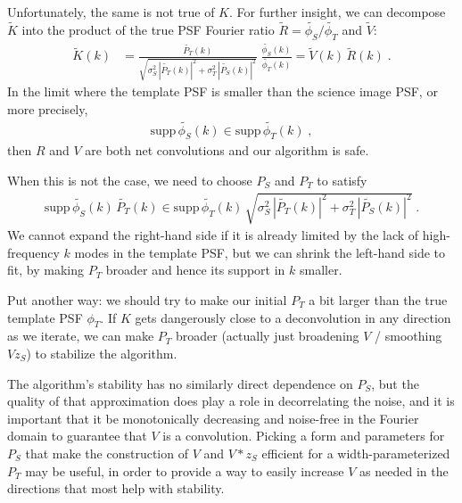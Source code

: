 \documentclass[DM,authoryear,toc]{lsstdoc}
\begin{document}
Unfortunately, the same is not true of $K$.
For further insight, we can decompose $\widetilde{K}$ into the product of the true PSF Fourier ratio $\widetilde{R} = \widetilde{\phi_S}/\widetilde{\phi_T}$ and $\widetilde{V}$:
\begin{align}
  \widetilde{K}(k) & = \frac{
    \widetilde{P_T}(k)
  }{
    \sqrt{
      \sigma_S^2 \, \left|\widetilde{P_T}(k)\right|^2
      + \sigma_T^2 \, \left|\widetilde{P_S}(k)\right|^2
    }
  }
  \;
  \frac{\widetilde{\phi_S}(k)}{\widetilde{\phi_T}(k)}
  = \widetilde{V}(k) \, \widetilde{R}(k) \; .
\end{align}
In the limit where the template PSF is smaller than the science image PSF, or more precisely,
\begin{align}
  \text{supp}\,\widetilde{\phi_S}(k) \in \text{supp}\,\widetilde{\phi_T}(k) \; ,
\end{align}
then $R$ and $V$ are both net convolutions and our algorithm is safe.

When this is not the case, we need to choose $P_S$ and $P_T$ to satisfy
\begin{align}
  \text{supp}\,\widetilde{\phi_S}(k)\,\widetilde{P_T}(k)
  \in \text{supp}\,\widetilde{\phi_T}(k) \, \sqrt{
    \sigma_S^2 \, \left|\widetilde{P_T}(k)\right|^2
    + \sigma_T^2 \, \left|\widetilde{P_S}(k)\right|^2
  } \; .
\end{align}
We cannot expand the right-hand side if it is already limited by the lack of high-frequency $k$ modes in the template PSF, but we can shrink the left-hand side to fit, by making $P_T$ broader and hence its support in $k$ smaller.

Put another way: we should try to make our initial $P_T$ a bit larger than the true template PSF $\phi_T$.
If $K$ gets dangerously close to a deconvolution in any direction as we iterate, we can make $P_T$ broader (actually just broadening $V$ / smoothing $V z_S$) to stabilize the algorithm.

The algorithm's stability has no similarly direct dependence on $P_S$, but the quality of that approximation does play a role in decorrelating the noise, and it is important that it be monotonically decreasing and noise-free in the Fourier domain to guarantee that $V$ is a convolution.
Picking a form and parameters for $P_S$ that make the construction of $V$ and $V \ast z_S$ efficient for a width-parameterized $P_T$ may be useful, in order to provide a way to easily increase $V$ as needed in the directions that most help with stability.
\end{document}
